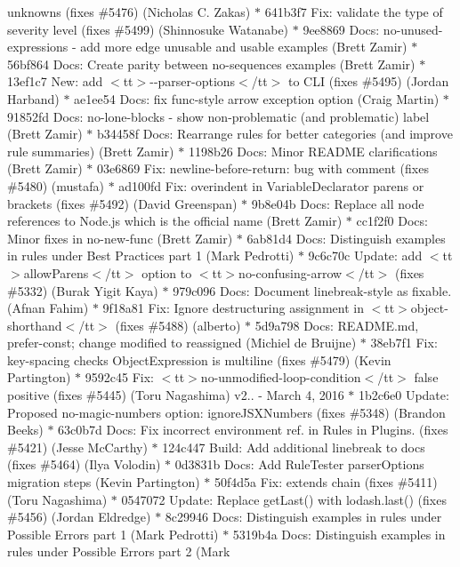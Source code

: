 \begin{DoxyItemize}
unknowns (fixes \#5476) (\+Nicholas C. Zakas) \texorpdfstring{$\ast$}{*} 641b3f7 Fix\+: validate the type of severity level (fixes \#5499) (\+Shinnosuke Watanabe) \texorpdfstring{$\ast$}{*} 9ee8869 Docs\+: no-\/unused-\/expressions -\/ add more edge unusable and usable examples (\+Brett Zamir) \texorpdfstring{$\ast$}{*} 56bf864 Docs\+: Create parity between no-\/sequences examples (\+Brett Zamir) \texorpdfstring{$\ast$}{*} 13ef1c7 New\+: add $<$tt$>$-\/-\/parser-\/options$<$/tt$>$ to CLI (fixes \#5495) (\+Jordan Harband) \texorpdfstring{$\ast$}{*} ae1ee54 Docs\+: fix func-\/style arrow exception option (\+Craig Martin) \texorpdfstring{$\ast$}{*} 91852fd Docs\+: no-\/lone-\/blocks -\/ show non-\/problematic (and problematic) label (\+Brett Zamir) \texorpdfstring{$\ast$}{*} b34458f Docs\+: Rearrange rules for better categories (and improve rule summaries) (\+Brett Zamir) \texorpdfstring{$\ast$}{*} 1198b26 Docs\+: Minor README clarifications (\+Brett Zamir) \texorpdfstring{$\ast$}{*} 03e6869 Fix\+: newline-\/before-\/return\+: bug with comment (fixes \#5480) (mustafa) \texorpdfstring{$\ast$}{*} ad100fd Fix\+: overindent in Variable\+Declarator parens or brackets (fixes \#5492) (\+David Greenspan) \texorpdfstring{$\ast$}{*} 9b8e04b Docs\+: Replace all node references to Node.\+js which is the official name (\+Brett Zamir) \texorpdfstring{$\ast$}{*} cc1f2f0 Docs\+: Minor fixes in no-\/new-\/func (\+Brett Zamir) \texorpdfstring{$\ast$}{*} 6ab81d4 Docs\+: Distinguish examples in rules under Best Practices part 1 (\+Mark Pedrotti) \texorpdfstring{$\ast$}{*} 9c6c70c Update\+: add $<$tt$>$allow\+Parens$<$/tt$>$ option to $<$tt$>$no-\/confusing-\/arrow$<$/tt$>$ (fixes \#5332) (\+Burak Yigit Kaya) \texorpdfstring{$\ast$}{*} 979c096 Docs\+: Document linebreak-\/style as fixable. (\+Afnan Fahim) \texorpdfstring{$\ast$}{*} 9f18a81 Fix\+: Ignore destructuring assignment in $<$tt$>$object-\/shorthand$<$/tt$>$ (fixes \#5488) (alberto) \texorpdfstring{$\ast$}{*} 5d9a798 Docs\+: README.\+md, prefer-\/const; change modified to reassigned (\+Michiel de Bruijne) \texorpdfstring{$\ast$}{*} 38eb7f1 Fix\+: key-\/spacing checks Object\+Expression is multiline (fixes \#5479) (\+Kevin Partington) \texorpdfstring{$\ast$}{*} 9592c45 Fix\+: $<$tt$>$no-\/unmodified-\/loop-\/condition$<$/tt$>$ false positive (fixes \#5445) (\+Toru Nagashima)  v2.. -\/ March 4, 2016  \texorpdfstring{$\ast$}{*} 1b2c6e0 Update\+: Proposed no-\/magic-\/numbers option\+: ignore\+JSXNumbers (fixes \#5348) (\+Brandon Beeks) \texorpdfstring{$\ast$}{*} 63c0b7d Docs\+: Fix incorrect environment ref. in Rules in Plugins. (fixes \#5421) (\+Jesse Mc\+Carthy) \texorpdfstring{$\ast$}{*} 124c447 Build\+: Add additional linebreak to docs (fixes \#5464) (\+Ilya Volodin) \texorpdfstring{$\ast$}{*} 0d3831b Docs\+: Add Rule\+Tester parser\+Options migration steps (\+Kevin Partington) \texorpdfstring{$\ast$}{*} 50f4d5a Fix\+: extends chain (fixes \#5411) (\+Toru Nagashima) \texorpdfstring{$\ast$}{*} 0547072 Update\+: Replace get\+Last() with lodash.\+last() (fixes \#5456) (\+Jordan Eldredge) \texorpdfstring{$\ast$}{*} 8c29946 Docs\+: Distinguish examples in rules under Possible Errors part 1 (\+Mark Pedrotti) \texorpdfstring{$\ast$}{*} 5319b4a Docs\+: Distinguish examples in rules under Possible Errors part 2 (\+Mark 
\end{DoxyItemize}
